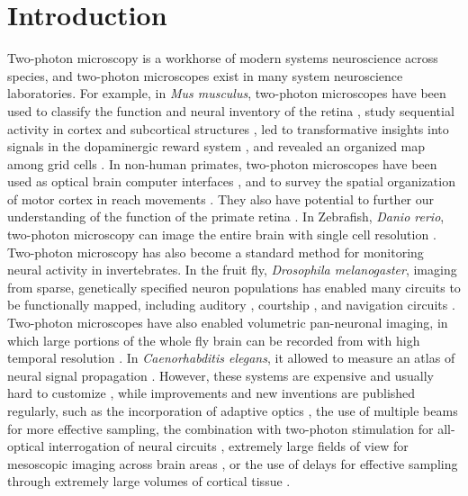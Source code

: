 \documentclass[10pt,letterpaper]{article}
\begin{document}
\linenumbers

\section*{Introduction}
%
Two-photon microscopy\cite{Denk1990, Svoboda1997, So2000, Helmchen2005} is a workhorse of modern systems neuroscience across species, and two-photon microscopes exist in many system neuroscience laboratories\cite{Luu2024, Grienberger2022}. For example, in \textit{Mus musculus}, two-photon microscopes have been used to classify the function and neural inventory of the retina \cite{Baden2016}, study sequential activity in cortex \cite{Harvey2012} and subcortical structures \cite{Nieh2021}, led to transformative insights into signals in the dopaminergic reward system \cite{Engelhard2019}, and revealed an organized map among grid cells \cite{Yu2018}. In non-human primates, two-photon microscopes have been used as optical brain computer interfaces \cite{Trautmann2021}, and to survey the spatial organization of motor cortex in reach movements \cite{Ebina2018}. They also have potential to further our understanding of the function of the primate retina \cite{Sharma2016, Schottdorf2021}. In Zebrafish, \textit{Danio rerio}, two-photon microscopy can image the entire brain with single cell resolution \cite{Renninger2013}. Two-photon microscopy has also become a standard method for monitoring neural activity in invertebrates. In the fruit fly, \textit{Drosophila melanogaster}, imaging from sparse, genetically specified neuron populations \cite{Seelig2010, Lin2022} has enabled many circuits to be functionally mapped, including auditory \cite{Baker2022}, courtship \cite{Deutsch2020, Roemschied2023}, and navigation circuits \cite{Kim2017}. Two-photon microscopes have also enabled volumetric pan-neuronal imaging, in which large portions of the whole fly brain can be recorded from with high temporal resolution \cite{Pacheco2021,Brezovec2024}. In \textit{Caenorhabditis elegans}, it allowed to measure an atlas of neural signal propagation \cite{Randi2023}.\newline
However, these systems are expensive and usually hard to customize \cite{Diamanti2021}, while improvements and new inventions are published regularly, such as the incorporation of adaptive optics \cite{Yao2023}, the use of multiple beams for more effective sampling\cite{Song2017}, the combination with two-photon stimulation for all-optical interrogation of neural circuits \cite{Rickgauer2014}, extremely large fields of view for mesoscopic imaging across brain areas \cite{Sofroniew2016}, or the use of delays for effective sampling through extremely large volumes of cortical tissue \cite{Demas2021}.\newline
\end{document}
